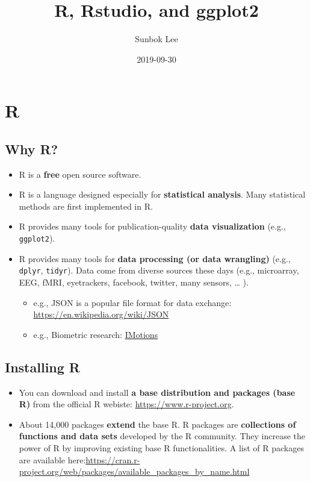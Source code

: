 \documentclass[]{book}
\title{R, Rstudio, and ggplot2}
\author{Sunbok Lee}
\date{2019-09-30}
\providecommand{\tightlist}{%
  \setlength{\itemsep}{0pt}\setlength{\parskip}{0pt}}
\begin{document}
\maketitle

{
\setcounter{tocdepth}{1}
\tableofcontents
}
\hypertarget{r}{%
\chapter{R}\label{r}}

\hypertarget{why-r}{%
\section{Why R?}\label{why-r}}

\begin{itemize}
\tightlist
\item
  R is a \textbf{free} open source software.
\item
  R is a language designed especially for \textbf{statistical analysis}. Many statistical methods are first implemented in R.
\item
  R provides many tools for publication-quality \textbf{data visualization} (e.g., \texttt{ggplot2}).
\item
  R provides many tools for \textbf{data processing (or data wrangling)} (e.g., \texttt{dplyr}, \texttt{tidyr}). Data come from diverse sources these days (e.g., microarray, EEG, fMRI, eyetrackers, facebook, twitter, many sensors, \ldots{} ).

  \begin{itemize}
  \tightlist
  \item
    e.g., JSON is a popular file format for data exchange: \url{https://en.wikipedia.org/wiki/JSON}
  \item
    e.g., Biometric research: \href{https://imotions.com/?creative=287840870074\&keyword=imotions\&matchtype=p\&network=g\&device=c\&gclid=EAIaIQobChMI3pas5oOO5AIVlBx9Ch28hwboEAAYASAAEgJlUfD_BwE}{IMotions}
  \end{itemize}
\end{itemize}

\hypertarget{installing-r}{%
\section{Installing R}\label{installing-r}}

\begin{itemize}
\item
  You can download and install \textbf{a base distribution and packages (base R)} from the official R webiste: \url{https://www.r-project.org}.
\item
  About 14,000 packages \textbf{extend} the base R. R packages are \textbf{collections of functions and data sets} developed by the R community. They increase the power of R by improving existing base R functionalities. A list of R packages are available here:\url{https://cran.r-project.org/web/packages/available_packages_by_name.html}
\end{itemize}
\end{document}
